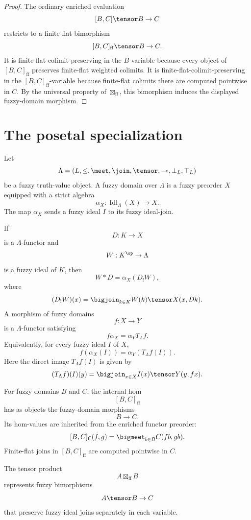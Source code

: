 \begin{proof}
The ordinary enriched evaluation
\[
    [B,C]\tensor B\to C
\]
restricts to a finite-flat bimorphism
\[
    [B,C]_{\mathrm{ff}}\tensor B\to C.
\]
It is finite-flat-colimit-preserving in the \(B\)-variable because every object
of \([B,C]_{\mathrm{ff}}\) preserves finite-flat weighted colimits.  It is
finite-flat-colimit-preserving in the \([B,C]_{\mathrm{ff}}\)-variable because
finite-flat colimits there are computed pointwise in \(C\).  By the universal
property of \(\boxtimes_{\mathrm{ff}}\), this bimorphism induces the displayed
fuzzy-domain morphism.
\end{proof}

\section{The posetal specialization}
\label{sec:posetal-specialization-fdom-rewrite}

Let
\[
    \Lambda=(L,\leq,\meet,\join,\tensor,\multimap,\bot_L,\top_L)
\]
be a fuzzy truth-value object.  A fuzzy domain over \(\Lambda\) is a fuzzy
preorder \(X\) equipped with a strict algebra
\[
    \alpha_X:\operatorname{Idl}_{\Lambda}(X)\to X.
\]
The map \(\alpha_X\) sends a fuzzy ideal \(I\) to its fuzzy ideal-join.

If
\[
    D:K\to X
\]
is a \(\Lambda\)-functor and
\[
    W:K^{\op}\to\Lambda
\]
is a fuzzy ideal of \(K\), then
\[
    W*D
    =
    \alpha_X(D_!W),
\]
where
\[
    (D_!W)(x)
    =
    \bigjoin_{k\in K}
        W(k)\tensor X(x,Dk).
\]
A morphism of fuzzy domains
\[
    f:X\to Y
\]
is a \(\Lambda\)-functor satisfying
\[
    f\alpha_X
    =
    \alpha_YT_{\Lambda}f.
\]
Equivalently, for every fuzzy ideal \(I\) of \(X\),
\[
    f(\alpha_X(I))
    =
    \alpha_Y(T_{\Lambda}f(I)).
\]
Here the direct image \(T_\Lambda f(I)\) is given by
\[
    (T_\Lambda f)(I)(y)
    =
    \bigjoin_{x\in X} I(x)\tensor Y(y,fx).
\]

For fuzzy domains \(B\) and \(C\), the internal hom
\[
    [B,C]_{\mathrm{ff}}
\]
has as objects the fuzzy-domain morphisms
\[
    B\to C.
\]
Its hom-values are inherited from the enriched functor preorder:
\[
    [B,C]_{\mathrm{ff}}(f,g)
    =
    \bigmeet_{b\in B}C(fb,gb).
\]
Finite-flat joins in \([B,C]_{\mathrm{ff}}\) are computed pointwise in \(C\).

The tensor product
\[
    A\boxtimes_{\mathrm{ff}}B
\]
represents fuzzy bimorphisms
\[
    A\tensor B\to C
\]
that preserve fuzzy ideal joins separately in each variable.

